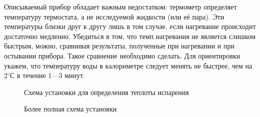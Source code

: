 \documentclass[a4paper, 12pt]{article}
\begin{document}
Описываемый прибор обладает важным недостатком: термометр определяет температуру термостата, а не исследуемой жидкости (или её пара). Эти температуры близки друг к другу лишь в том случае, если нагревание происходит достаточно медленно. Убедиться в том, что темп нагревания не является слишком быстрым, можно, сравнивая результаты, полученные при нагревании и при остывании прибора. Такое сравнение необходимо сделать. Для ориентировки укажем, что температуру воды в калориметре следует менять не быстрее, чем на $2^{\circ}$С в течение 1---3 минут. 

\begin{figure}[h]	\label{plan1}
	
	\caption{Схема установки для определения теплоты испарения}

\end{figure}	

\begin{figure}[b!]	\label{plan2}
	
	\caption{Более полная схема установки}

\end{figure}
\end{document}
